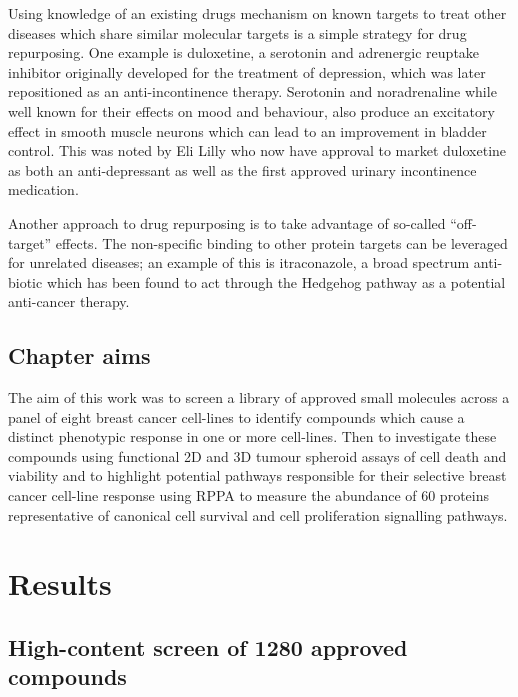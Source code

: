 \documentclass[a4paper,11pt,twoside,openright]{scrbook}
\begin{document}
Using knowledge of an existing drugs mechanism on known targets to treat other diseases which share similar molecular 
targets is a simple strategy for drug repurposing.
One example is duloxetine, a serotonin and adrenergic reuptake inhibitor originally developed for the treatment of 
depression, which was later repositioned as an anti-incontinence therapy. \cite{Ashburn2004}
Serotonin and noradrenaline while well known for their effects on mood and behaviour, also produce an excitatory effect 
in smooth muscle neurons which can lead to an improvement in bladder control.
This was noted by Eli Lilly who now have approval to market duloxetine as both an anti-depressant as well as the first 
approved urinary incontinence medication.

Another approach to drug repurposing is to take advantage of so-called ``off-target'' effects.
The non-specific binding to other protein targets can be leveraged for unrelated diseases; an example of this is 
itraconazole, a broad spectrum anti-biotic which has been found to act through the Hedgehog pathway as a potential 
anti-cancer therapy. \cite{Pounds2017}


\subsection{Chapter aims}
The aim of this work was to screen a library of approved small molecules across a panel of eight breast cancer 
cell-lines to identify compounds which cause a distinct phenotypic response in one or more cell-lines.
Then to investigate these compounds using functional 2D and 3D tumour spheroid assays of cell death and viability and 
to highlight potential pathways responsible for their selective breast cancer cell-line response using RPPA to measure 
the abundance of 60 proteins representative of canonical cell survival and cell proliferation signalling pathways.



\section{Results}

\subsection{High-content screen of 1280 approved compounds}
\end{document}

